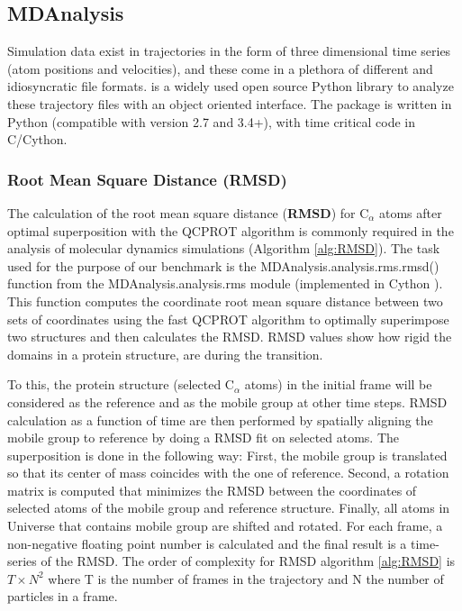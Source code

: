 \label{use_cases}

\subsection{MDAnalysis}
Simulation data exist in trajectories in the form of three dimensional time series (atom positions and velocities), and these come in a plethora of different and idiosyncratic file formats. 
 is a widely used open source Python library to analyze these trajectory files with an object oriented interface. 
The package is written in Python (compatible with version 2.7 and 3.4+), with time critical code in C/Cython. 
\label{sec:mda}

\subsubsection{Root Mean Square Distance (RMSD)}
The calculation of the root mean square distance (\textbf{RMSD}) for C$_{\alpha}$ atoms after
optimal superposition with the QCPROT algorithm \citep{Liu:2010kx,Theobald:2005vn} is commonly required in the analysis of molecular dynamics simulations (Algorithm \ref{alg:RMSD}). 
The task used for the purpose of our benchmark is the MDAnalysis.analysis.rms.rmsd() function from the MDAnalysis.analysis.rms module (implemented in Cython \citep{Gowers:2016aa}).  
This function computes the coordinate root mean square distance between two sets of coordinates using the fast QCPROT algorithm to optimally superimpose two structures and then calculates the RMSD. 
RMSD values show how rigid the domains in a protein structure, are during the transition. 

To this, the protein structure (selected C$_{\alpha}$ atoms) in the initial frame will be considered as the reference and as the mobile group at other time steps. 
RMSD calculation as a function of time are then performed by spatially aligning the mobile group to reference by doing a RMSD fit on selected atoms.
The superposition is done in the following way:
First, the mobile group is translated so that its center of mass coincides with the one of reference. 
Second, a rotation matrix is computed that minimizes the RMSD between the coordinates of selected atoms of the mobile group and reference structure. 
Finally, all atoms in Universe that contains mobile group are shifted and rotated.
For each frame, a non-negative floating point number is calculated and the final result is a time-series of the RMSD. 
The order of complexity for RMSD algorithm \ref{alg:RMSD} is $T \times N^{2}$ where T is the number of frames in the trajectory and N the number of particles in a frame.

